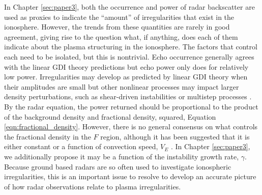 In Chapter \ref{sec:paper3}, both the occurrence and power of radar backscatter are used as proxies to indicate the ``amount'' of irregularities that exist in the ionosphere.  However, the trends from these quantities are rarely in good agreement, giving rise to the question what, if anything, does each of them indicate about the plasma structuring in the ionosphere.  The factors that control each need to be isolated, but this is nontrivial.  Echo occurrence generally agrees with the linear GDI theory predictions but echo power only does for relatively low power.  Irregularities may develop as predicted by linear GDI theory when their amplitudes are small but other nonlinear processes may impact larger density perturbations, such as shear-driven instabilities \citep{Gondarenko2006} or multistep processes \citep{Carlson2012}.  By the radar equation, the power returned should be proportional to the product of the background density and fractional density, squared, Equation \ref{eqn:fractional_density}.  However, there is no general consensus on what controls the fractional density in the \(F\) region, although it has been suggested that it is either constant or a function of convection speed, \(V_E\) \citep{Koustov1988,Haldoupis1990,Makarevich2014b}.  In Chapter \ref{sec:paper3}, we additionally propose it may be a function of the instability growth rate, \(\gamma\).  Because ground based radars are so often used to investigate ionospheric irregularities, this is an important issue to resolve to develop an accurate picture of how radar observations relate to plasma irregularities.



